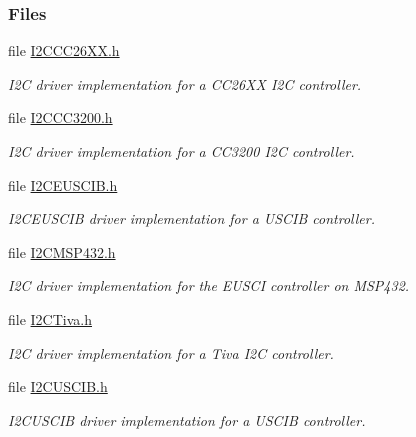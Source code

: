 \subsubsection*{Files}
\begin{DoxyCompactItemize}
\item 
file \hyperlink{_i2_c_c_c26_x_x_8h}{I2\+C\+C\+C26\+X\+X.\+h}
\begin{DoxyCompactList}\small\item\em I2\+C driver implementation for a C\+C26\+X\+X I2\+C controller. \end{DoxyCompactList}\item 
file \hyperlink{_i2_c_c_c3200_8h}{I2\+C\+C\+C3200.\+h}
\begin{DoxyCompactList}\small\item\em I2\+C driver implementation for a C\+C3200 I2\+C controller. \end{DoxyCompactList}\item 
file \hyperlink{_i2_c_e_u_s_c_i_b_8h}{I2\+C\+E\+U\+S\+C\+I\+B.\+h}
\begin{DoxyCompactList}\small\item\em I2\+C\+E\+U\+S\+C\+I\+B driver implementation for a U\+S\+C\+I\+B controller. \end{DoxyCompactList}\item 
file \hyperlink{_i2_c_m_s_p432_8h}{I2\+C\+M\+S\+P432.\+h}
\begin{DoxyCompactList}\small\item\em I2\+C driver implementation for the E\+U\+S\+C\+I controller on M\+S\+P432. \end{DoxyCompactList}\item 
file \hyperlink{_i2_c_tiva_8h}{I2\+C\+Tiva.\+h}
\begin{DoxyCompactList}\small\item\em I2\+C driver implementation for a Tiva I2\+C controller. \end{DoxyCompactList}\item 
file \hyperlink{_i2_c_u_s_c_i_b_8h}{I2\+C\+U\+S\+C\+I\+B.\+h}
\begin{DoxyCompactList}\small\item\em I2\+C\+U\+S\+C\+I\+B driver implementation for a U\+S\+C\+I\+B controller. \end{DoxyCompactList}\end{DoxyCompactItemize}
